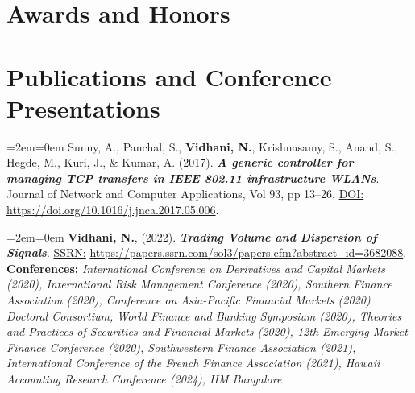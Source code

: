 \documentclass[11pt,a4paper,]{moderncv}
\begin{document}
\hypertarget{awards-and-honors}{%
\section{Awards and Honors}\label{awards-and-honors}}

\nopagebreak

\hypertarget{publications-and-conference-presentations}{%
\section{Publications and Conference
Presentations}\label{publications-and-conference-presentations}}

\begingroup
\setlength{\parindent}{-0.5in}
\setlength{\leftskip}{0.5in}

%
  \par%
  \medskip
  \leftskip=2em\rightskip=0em%
  \noindent\ignorespaces
Sunny, A., Panchal, S., \textbf{Vidhani, N.}, Krishnasamy, S., Anand, S., Hegde, M., Kuri, J., \& Kumar, A. (2017).
\textbf{\textit{A generic controller for managing TCP transfers in IEEE 802.11 infrastructure WLANs}}. Journal of Network and Computer Applications, Vol 93, pp 13--26. \underline{DOI:} \url{https://doi.org/10.1016/j.jnca.2017.05.006}.\\
%
  \par\medskip

%
  \par%
  \medskip
  \leftskip=2em\rightskip=0em%
  \noindent\ignorespaces
\textbf{Vidhani, N.}, (2022). \textbf{\textit{Trading Volume and Dispersion of Signals}}. \underline{SSRN:} \url{https://papers.ssrn.com/sol3/papers.cfm?abstract_id=3682088}.\\
\textbf{Conferences:} \textit{International Conference on Derivatives and Capital Markets (2020), International Risk Management Conference (2020), Southern Finance Association (2020), Conference on Asia-Pacific Financial Markets (2020) Doctoral Consortium, World Finance and Banking Symposium (2020), Theories and Practices of Securities and Financial Markets (2020), 12th Emerging Market Finance Conference (2020), Southwestern Finance Association (2021), International Conference of the French Finance Association (2021), Hawaii Accounting Research Conference (2024), IIM Bangalore}\\
%
  \par\medskip
\end{document}
